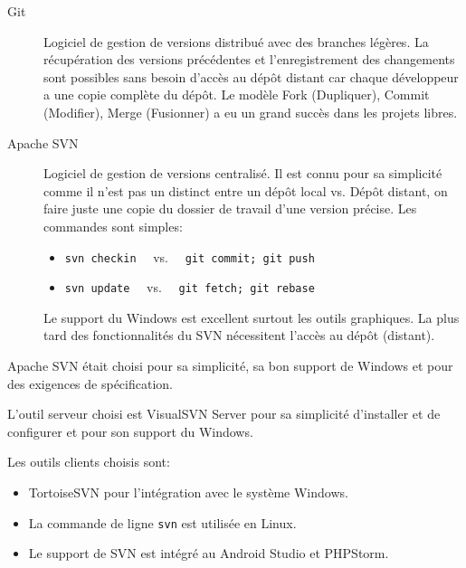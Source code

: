 \begin{description}
    \item [Git] Logiciel de gestion de versions distribué avec des branches
        légères. La récupération des versions précédentes et l'enregistrement
        des changements sont possibles sans besoin d'accès au dépôt distant car
        chaque développeur a une copie complète du dépôt. Le modèle Fork
        (Dupliquer), Commit (Modifier), Merge (Fusionner) a eu un grand succès
        dans les projets libres.
    \item [Apache SVN] Logiciel de gestion de versions centralisé. Il est connu
        pour sa simplicité comme il n'est pas un distinct entre un dépôt local
        vs. Dépôt distant, on faire juste une copie du dossier de travail
        d'une version précise. Les commandes sont simples:
        \begin{itemize}
            \item \verb|svn checkin| \ \ vs. \ \ \verb|git commit; git push|
            \item \verb|svn update| \ \ vs. \ \ \verb|git fetch; git rebase|
        \end{itemize}
        Le support du Windows est excellent surtout les outils graphiques.  La
        plus tard des fonctionnalités du SVN nécessitent l'accès au dépôt
        (distant).
\end{description}

Apache SVN était choisi pour sa simplicité, sa bon support de Windows et pour
des exigences de spécification. 

L'outil serveur choisi est VisualSVN Server pour sa simplicité d'installer et de
configurer et pour son support du Windows.

Les outils clients choisis sont:
\begin{itemize}
    \item TortoiseSVN pour l'intégration avec le système Windows.
    \item La commande de ligne \verb|svn| est utilisée en Linux.
    \item Le support de SVN est intégré au Android Studio et PHPStorm.
\end{itemize}

